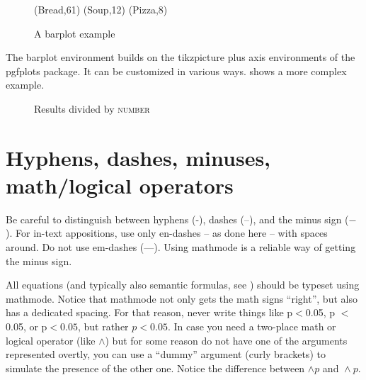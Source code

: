 \begin{figure}
    \centering
    {
    (Bread,61)
    (Soup,12)
    (Pizza,8)
    }
    \caption{A barplot example}
    \label{sim:fig:barplot}
\end{figure}

The barplot environment builds on the tikzpicture plus axis environments of the pgfplots package. It can be customized in various ways.  shows a more complex example.

\begin{figure}
    \caption{Results divided by \textsc{number}}
    \label{sim:fig:complex-barplot}
\end{figure}

\section{Hyphens, dashes, minuses, math/logical operators}\label{sim:sec:hyphens-etc}

Be careful to distinguish between hyphens (-), dashes (--), and the minus sign ($-$). For in-text appositions, use only en-dashes -- as done here -- with spaces around. Do not use em-dashes (---). Using mathmode is a reliable way of getting the minus sign.

All equations (and typically also semantic formulas, see ) should be typeset using mathmode. Notice that mathmode not only gets the math signs ``right'', but also has a dedicated spacing. For that reason, never write things like p$<$0.05, p $<$ 0.05, or p$<0.05$, but rather $p<0.05$. In case you need a two-place math or logical operator (like $\wedge$) but for some reason do not have one of the arguments represented overtly, you can use a ``dummy'' argument (curly brackets) to simulate the presence of the other one. Notice the difference between $\wedge p$ and ${}\wedge p$.

